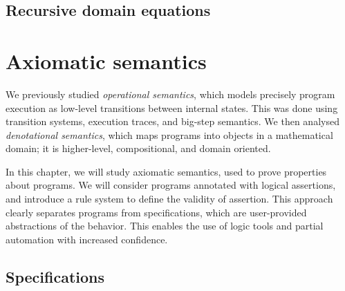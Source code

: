 \documentclass[toc]{../cs-classes/cs-classes}
\begin{document}
\subsection{Recursive domain equations}


\section{Axiomatic semantics}
We previously studied \emph{operational semantics}, which models precisely program execution as low-level transitions between internal states. This was done using transition systems, execution traces, and big-step semantics. We then analysed \emph{denotational semantics}, which maps programs into objects in a mathematical domain; it is higher-level, compositional, and domain oriented. 

In this chapter, we will study axiomatic semantics, used to prove properties about programs. We will consider programs annotated with logical assertions, and introduce a rule system to define the validity of assertion. This approach clearly separates programs from specifications, which are user-provided abstractions of the behavior. This enables the use of logic tools and partial automation with increased confidence.

\subsection{Specifications}
\end{document}
